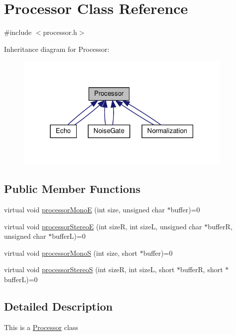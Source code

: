 \hypertarget{classProcessor}{}\section{Processor Class Reference}
\label{classProcessor}


{\ttfamily \#include $<$processor.\+h$>$}



Inheritance diagram for Processor\+:\nopagebreak
\begin{figure}[H]
\begin{center}
\leavevmode
\includegraphics[width=295pt]{classProcessor__inherit__graph}
\end{center}
\end{figure}
\subsection*{Public Member Functions}
\begin{DoxyCompactItemize}
\item 
virtual void \hyperlink{classProcessor_aa9742b5df48a3c6442d521ce93012fc1}{processor\+MonoE} (int size, unsigned char $\ast$buffer)=0
\item 
virtual void \hyperlink{classProcessor_a637904e06d0a3b14f9e1e90fe7f3afbd}{processor\+StereoE} (int sizeR, int sizeL, unsigned char $\ast$bufferR, unsigned char $\ast$bufferL)=0
\item 
virtual void \hyperlink{classProcessor_a4cf32c9f7e26383490e8fb49defcc287}{processor\+MonoS} (int size, short $\ast$buffer)=0
\item 
virtual void \hyperlink{classProcessor_ae3fc266daadbedfa947e596d3ff98a7c}{processor\+StereoS} (int sizeR, int sizeL, short $\ast$bufferR, short $\ast$bufferL)=0
\end{DoxyCompactItemize}


\subsection{Detailed Description}
This is a \hyperlink{classProcessor}{Processor} class 

